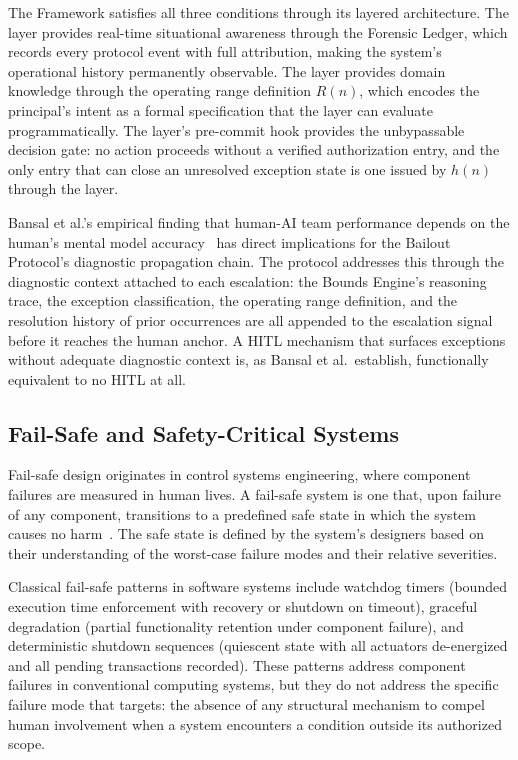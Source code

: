 The \bxthree{} Framework satisfies all three conditions through its layered architecture. The \fact{} layer provides real-time situational awareness through the Forensic Ledger, which records every protocol event with full attribution, making the system's operational history permanently observable. The \purpose{} layer provides domain knowledge through the operating range definition $R(n)$, which encodes the principal's intent as a formal specification that the \bounds{} layer can evaluate programmatically. The \fact{} layer's pre-commit hook provides the unbypassable decision gate: no action proceeds without a verified authorization entry, and the only entry that can close an unresolved exception state is one issued by $h(n)$ through the \purpose{} layer.

Bansal et al.'s empirical finding that human-AI team performance depends on the human's mental model accuracy~\cite{bansal2019} has direct implications for the Bailout Protocol's diagnostic propagation chain. The protocol addresses this through the diagnostic context attached to each escalation: the Bounds Engine's reasoning trace, the exception classification, the operating range definition, and the resolution history of prior occurrences are all appended to the escalation signal before it reaches the human anchor. A HITL mechanism that surfaces exceptions without adequate diagnostic context is, as Bansal et al.\ establish, functionally equivalent to no HITL at all.

\subsection{Fail-Safe and Safety-Critical Systems}

Fail-safe design originates in control systems engineering, where component failures are measured in human lives. A fail-safe system is one that, upon failure of any component, transitions to a predefined safe state in which the system causes no harm~\cite{wiener1948}. The safe state is defined by the system's designers based on their understanding of the worst-case failure modes and their relative severities.

Classical fail-safe patterns in software systems include watchdog timers (bounded execution time enforcement with recovery or shutdown on timeout), graceful degradation (partial functionality retention under component failure), and deterministic shutdown sequences (quiescent state with all actuators de-energized and all pending transactions recorded). These patterns address component failures in conventional computing systems, but they do not address the specific failure mode that \bxthree{} targets: the absence of any structural mechanism to compel human involvement when a system encounters a condition outside its authorized scope.

